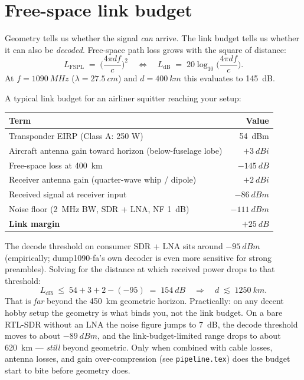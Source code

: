 \documentclass[11pt,a4paper]{article}
\begin{document}
\section{Free-space link budget}\label{sec:link}

Geometry tells us whether the signal \emph{can} arrive.  The link budget
tells us whether it can also be \emph{decoded}.  Free-space path loss
grows with the square of distance:
\begin{equation}
L_{\text{FSPL}} \;=\; \biggl(\frac{4 \pi d f}{c}\biggr)^{\!2}
\quad\Longleftrightarrow\quad
L_{\text{dB}} \;=\; 20 \log_{10}\!\biggl(\frac{4 \pi d f}{c}\biggr).
\end{equation}
At $f = \SI{1090}{MHz}$ ($\lambda = \SI{27.5}{cm}$) and $d = \SI{400}{km}$
this evaluates to \SI{145}{dB}.

A typical link budget for an airliner squitter reaching your setup:

\begin{center}
\begin{tabular}{l r}
\toprule
Term                                                   & Value            \\
\midrule
Transponder EIRP (Class A: 250 W)                      & \SI{54}{dBm}     \\
Aircraft antenna gain toward horizon (below-fuselage lobe) & $+\SI{3}{dBi}$   \\
Free-space loss at \SI{400}{km}                        & $-\SI{145}{dB}$  \\
Receiver antenna gain (quarter-wave whip / dipole)     & $+\SI{2}{dBi}$   \\
\midrule
Received signal at receiver input                      & $-\SI{86}{dBm}$  \\
Noise floor (\SI{2}{MHz} BW, SDR + LNA, NF \SI{1}{dB}) & $-\SI{111}{dBm}$ \\
\midrule
\textbf{Link margin}                                   & $+\SI{25}{dB}$   \\
\bottomrule
\end{tabular}
\end{center}

The decode threshold on consumer SDR + LNA sits around $-\SI{95}{dBm}$
(empirically; dump1090-fa's own decoder is even more sensitive for
strong preambles).  Solving for the distance at which received power
drops to that threshold:
\[
L_{\text{dB}} \;\le\; 54 + 3 + 2 - (-95) \;=\; \SI{154}{dB}
\quad\Longrightarrow\quad d \;\lesssim\; \SI{1250}{km}.
\]
That is \emph{far} beyond the \SI{450}{km} geometric horizon.
Practically: on any decent hobby setup the geometry is what binds you,
not the link budget.  On a bare RTL-SDR without an LNA the noise
figure jumps to \SI{7}{dB}, the decode threshold moves to about
$-\SI{89}{dBm}$, and the link-budget-limited range drops to
about \SI{620}{km} --- \emph{still} beyond geometric.  Only when
combined with cable losses, antenna losses, and gain over-compression
(see \texttt{pipeline.tex}) does the budget start to bite before
geometry does.
\end{document}
